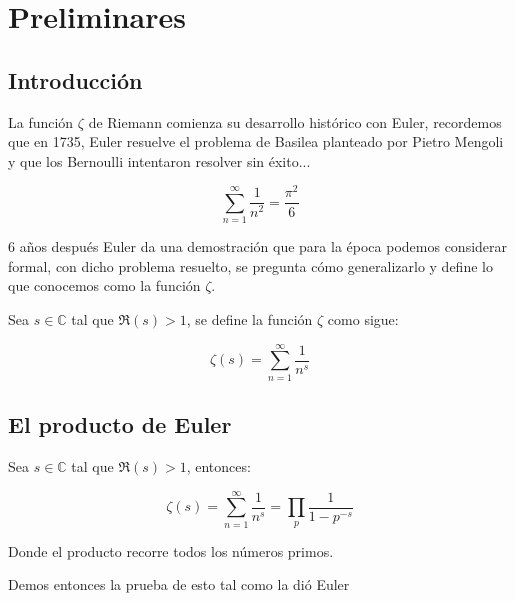 \thispagestyle{empty}
\vspace{-0.7cm}


\section{Preliminares}

\lipsum[3]

\subsection{Introducción}
La función $\zeta$ de Riemann comienza su desarrollo histórico con Euler, recordemos que en 1735, Euler resuelve el problema de Basilea planteado por Pietro Mengoli y que los Bernoulli intentaron resolver sin éxito...

$$\sum_{n=1}^{\infty}\dfrac{1}{n^2}=\dfrac{\pi^2}{6}$$

6 años después Euler da una demostración que para la época podemos considerar formal, con dicho problema resuelto, se pregunta cómo generalizarlo y define lo que conocemos como la función $\zeta$.

\begin{definition}
Sea $s \in \mathbb{C}$ tal que $\Re(s)>1$, se define la función $\zeta$ como sigue:

$$\zeta(s)=\sum_{n=1}^{\infty}\dfrac{1}{n^s}$$
\end{definition}

\begin{note}
  \lipsum[1]
\end{note}


\subsection{El producto de Euler}
\lipsum[2]
\begin{theorem}
    Sea $s\in \mathbb{C}$ tal que $\Re(s)>1$, entonces:

    $$\zeta(s)=\sum_{n=1}^{\infty}\dfrac{1}{n^s}=\prod_p \dfrac{1}{1-p^{-s}}$$

    Donde el producto recorre todos los números primos.
\end{theorem}

Demos entonces la prueba de esto tal como la dió Euler\\

